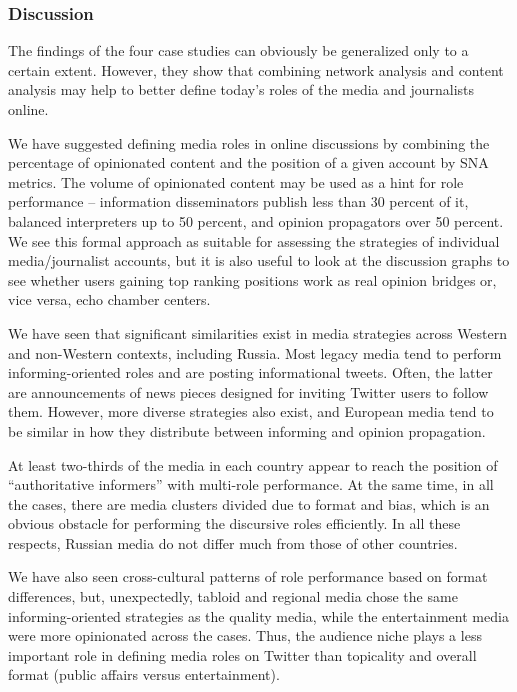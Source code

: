 \subsubsection{Discussion}

The findings of the four case studies can obviously be generalized only to a certain extent. However, they show that combining network analysis and content analysis may help to better define today’s roles of the media and journalists online.

We have suggested defining media roles in online discussions by combining the percentage of opinionated content and the position of a given account by SNA metrics. The volume of opinionated content may be used as a hint for role performance -- information disseminators publish less than 30 percent of it, balanced interpreters up to 50 percent, and opinion propagators over 50 percent. We see this formal approach as suitable for assessing the strategies of individual media/journalist accounts, but it is also useful to look at the discussion graphs to see whether users gaining top ranking positions work as real opinion bridges or, vice versa, echo chamber centers.

We have seen that significant similarities exist in media strategies across Western and non-Western contexts, including Russia. Most legacy media tend to perform informing-oriented roles and are posting informational tweets. Often, the latter are announcements of news pieces designed for inviting Twitter users to follow them. However, more diverse strategies also exist, and European media tend to be similar in how they distribute between informing and opinion propagation.

At least two-thirds of the media in each country appear to reach the position of “authoritative informers” with multi-role performance. At the same time, in all the cases, there are media clusters divided due to format and bias, which is an obvious obstacle for performing the discursive roles efficiently. In all these respects, Russian media do not differ much from those of other countries.

We have also seen cross-cultural patterns of role performance based on format differences, but, unexpectedly, tabloid and regional media chose the same informing-oriented strategies as the quality media, while the entertainment media were more opinionated across the cases. Thus, the audience niche plays a less important role in defining media roles on Twitter than topicality and overall format (public affairs versus entertainment).

